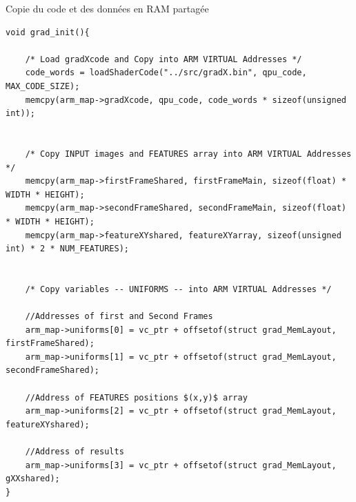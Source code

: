 \documentclass{bredelebeamer}
\begin{document}

\begin{frame}[fragile]{Copie du code et des données en RAM partagée}

\begin{lstlisting}
void grad_init(){

    /* Load gradXcode and Copy into ARM VIRTUAL Addresses */
    code_words = loadShaderCode("../src/gradX.bin", qpu_code, MAX_CODE_SIZE);
    memcpy(arm_map->gradXcode, qpu_code, code_words * sizeof(unsigned int));


    /* Copy INPUT images and FEATURES array into ARM VIRTUAL Addresses */
    memcpy(arm_map->firstFrameShared, firstFrameMain, sizeof(float) * WIDTH * HEIGHT);
    memcpy(arm_map->secondFrameShared, secondFrameMain, sizeof(float) * WIDTH * HEIGHT);
    memcpy(arm_map->featureXYshared, featureXYarray, sizeof(unsigned int) * 2 * NUM_FEATURES);


    /* Copy variables -- UNIFORMS -- into ARM VIRTUAL Addresses */

    //Addresses of first and Second Frames
    arm_map->uniforms[0] = vc_ptr + offsetof(struct grad_MemLayout, firstFrameShared);
    arm_map->uniforms[1] = vc_ptr + offsetof(struct grad_MemLayout, secondFrameShared);

    //Address of FEATURES positions $(x,y)$ array
    arm_map->uniforms[2] = vc_ptr + offsetof(struct grad_MemLayout, featureXYshared);

    //Address of results
    arm_map->uniforms[3] = vc_ptr + offsetof(struct grad_MemLayout, gXXshared);
}
\end{lstlisting}

\end{frame}

\end{document}

